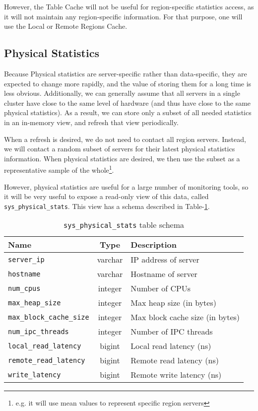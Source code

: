 However, the Table Cache will not be useful for region-specific statistics access, as it will not maintain any region-specific information. For that purpose, one will use the Local or Remote Regions Cache.

\subsection{Physical Statistics}
Because Physical statistics are server-specific rather than data-specific, they are expected to change more rapidly, and the value of storing them for a long time is less obvious. Additionally, we can generally assume that all servers in a single cluster have close to the same level of hardware (and thus have close to the same physical statistics). As a result, we can store only a subset of all needed statistics in an in-memory view, and refresh that view periodically. 

When a refresh is desired, we do not need to contact all region servers. Instead, we will contact a random subset of servers for their latest physical statistics information. When physical statistics are desired, we then use the subset as a representative sample of the whole\footnote{e.g. it will use mean values to represent specific region servers}.

However, physical statistics are useful for a large number of monitoring tools, so it will be very useful to expose a read-only view of this data, called \texttt{sys\_physical\_stats}. This view has a schema described in Table-\ref{table:physicalStats}.

\begin{table}
				\begin{tabular}{|l|c|p{6cm}|}
								\hline
								\bf{Name}													& \bf{Type}	&	\bf{Description} \\ \hline	
								\texttt{server\_ip}								&	varchar		&	IP address of server \\ \hline
								\texttt{hostname}									&	varchar		&	Hostname of server \\ \hline
								\texttt{num\_cpus}								&	integer		& Number of CPUs \\ \hline
								\texttt{max\_heap\_size}					&	integer		&	Max heap size (in bytes)\\ \hline
								\texttt{max\_block\_cache\_size}	&	integer		&	Max block cache size (in bytes) \\ \hline
								\texttt{num\_ipc\_threads}				&	integer		&	Number of IPC threads \\ \hline
								\texttt{local\_read\_latency}			&	bigint		&	Local read latency (ns) \\ \hline
								\texttt{remote\_read\_latency}		&	bigint		& Remote read latency (ns) \\ \hline
								\texttt{write\_latency}						&	bigint		&	Remote write latency (ns) \\ \hline
				\end{tabular}
				\caption{\texttt{sys\_physical\_stats} table schema}
				\label{table:physicalStats}
\end{table}

